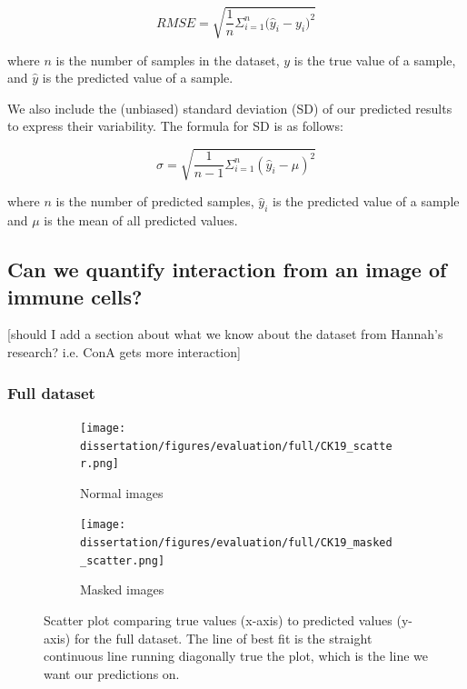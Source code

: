 \begin{equation*}
    RMSE = \sqrt{\frac{1}{n}{\Sigma_{i=1}^{n}{\Big({\hat{y}_i-y_i})}^2}}
\end{equation*}

where $n$ is the number of samples in the dataset, $y$ is the true value of a sample, and $\hat{y}$ is the predicted value of a sample.

We also include the (unbiased) standard deviation (SD) of our predicted results to express their variability. The formula for SD is as follows:

\begin{equation*}
    \sigma = \sqrt{\frac{1}{n-1}\Sigma_{i=1}^{n}{(\hat{y}_i - \mu)}^2}
\end{equation*}

where $n$ is the number of predicted samples, $\hat{y}_i$ is the predicted value of a sample and $\mu$ is the mean of all predicted values.

\subsection{Can we quantify interaction from an image of immune cells?}

[should I add a section about what we know about the dataset from Hannah's research? i.e. ConA gets more interaction]

\bigskip
\subsubsection{Full dataset}
\hfill
\hfill

\begin{figure}[h!]
    \centering
    \begin{subfigure}{0.45\textwidth}
        \texttt{[image: dissertation/figures/evaluation/full/CK19\_scatter.png]}
        \caption{Normal images}
    \end{subfigure}
    \begin{subfigure}{0.45\textwidth}
        \texttt{[image: dissertation/figures/evaluation/full/CK19\_masked\_scatter.png]}
        \caption{Masked images}
    \end{subfigure}
    \caption{Scatter plot comparing true values (x-axis) to predicted values (y-axis) for the full dataset. The line of best fit is the straight continuous line running diagonally true the plot, which is the line we want our predictions on.}
    \label{fig:full_scatter}
\end{figure}

